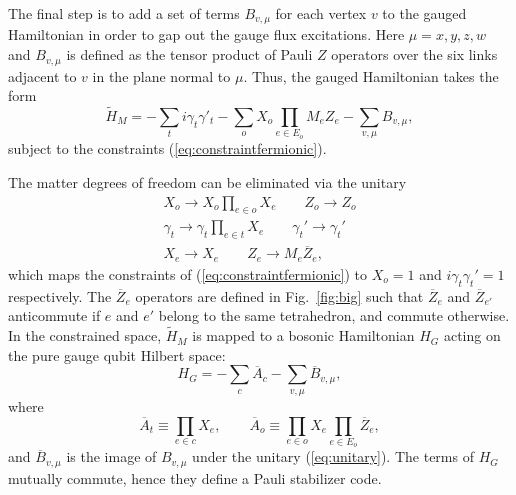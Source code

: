 \documentclass[prx,twocolumn,superscriptaddress,nofootinbib,showpacs,notitlepage]{revtex4-2}
\begin{document}
The final step is to add a set of terms $B_{v,\mu}$ for each vertex $v$ to the gauged Hamiltonian in order to gap out the gauge flux excitations. Here $\mu=x,y,z,w$ and $B_{v,\mu}$ is defined as the tensor product of Pauli $Z$ operators over the six links adjacent to $v$ in the plane normal to $\mu$. Thus, the gauged Hamiltonian takes the form
\begin{equation}
    \tilde{H}_M=-\sum_ti\gamma_t\gamma'_t-\sum_oX_o\prod_{e\in E_o}M_eZ_e-\sum_{v,\mu}B_{v,\mu},
\end{equation}
subject to the constraints (\ref{eq:constraintfermionic}).

The matter degrees of freedom can be eliminated via the unitary
\begin{equation}\begin{split}
    X_o\to X_o\prod_{e\in o}X_e\qquad Z_o\to Z_o\\
    \gamma_t\to\gamma_t\prod_{e\in t}X_e\qquad\gamma_t'\to\gamma_t'\\
    X_e\to X_e\qquad Z_e\to M_e\overline{Z}_e,
    \label{eq:unitary}
\end{split}\end{equation}
which maps the constraints of (\ref{eq:constraintfermionic}) to $X_o=1$ and $i\gamma_t\gamma_t'=1$ respectively. The $\overline{Z}_e$ operators are defined in Fig.~\ref{fig:big} such that $\overline{Z}_e$ and $\overline{Z}_{e'}$ anticommute if $e$ and $e'$ belong to the same tetrahedron, and commute otherwise. In the constrained space, $\tilde{H}_M$ is mapped to a bosonic Hamiltonian $H_G$ acting on the pure gauge qubit Hilbert space:
\begin{equation}
    H_G=-\sum_c\overline{A}_c-\sum_{v,\mu}\overline{B}_{v,\mu},
\end{equation}
where
\begin{equation}
    \overline{A}_t\equiv\prod_{e\in c}X_e,\qquad
    \overline{A}_o\equiv\prod_{e\in o}X_e\prod_{e\in E_o}\overline{Z}_e,
\end{equation}
and $\overline{B}_{v,\mu}$ is the image of $B_{v,\mu}$ under the unitary (\ref{eq:unitary}). The terms of $H_G$ mutually commute, hence they define a Pauli stabilizer code.
\end{document}
